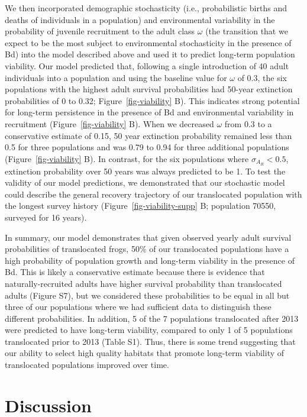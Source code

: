 \documentclass[9pt,twocolumn,twoside,lineno]{pnas-new}
\begin{document}
We then incorporated demographic stochasticity (i.e., probabilistic
births and deaths of individuals in a population) and environmental
variability in the probability of juvenile recruitment to the adult
class \(\omega\) (the transition that we expect to be the most subject
to environmental stochasticity in the presence of Bd) into the model
described above and used it to predict long-term population viability.
Our model predicted that, following a single introduction of 40 adult
individuals into a population and using the baseline value for
\(\omega\) of 0.3, the six populations with the highest adult survival
probabilities had 50-year extinction probabilities of 0 to 0.32;
Figure~\ref{fig-viability} B). This indicates strong potential for
long-term persistence in the presence of Bd and environmental
variability in recruitment (Figure~\ref{fig-viability} B). When we
decreased \(\omega\) from 0.3 to a conservative estimate of 0.15, 50
year extinction probability remained less than 0.5 for three populations
and was 0.79 to 0.94 for three additional populations
(Figure~\ref{fig-viability} B). In contrast, for the six populations
where \(\sigma_{A_R} < 0.5\), extinction probability over 50 years was
always predicted to be 1. To test the validity of our model predictions,
we demonstrated that our stochastic model could describe the general
recovery trajectory of our translocated population with the longest
survey history (Figure~\ref{fig-viability-supp} B; population 70550,
surveyed for 16 years).

In summary, our model demonstrates that given observed yearly adult
survival probabilities of translocated frogs, 50\% of our translocated
populations have a high probability of population growth and long-term
viability in the presence of Bd. This is likely a conservative estimate
because there is evidence that naturally-recruited adults have higher
survival probability than translocated adults
(Figure S7), but we considered these
probabilities to be equal in all but three of our populations where we
had sufficient data to distinguish these different probabilities. In
addition, 5 of the 7 populations translocated after 2013 were predicted
to have long-term viability, compared to only 1 of 5 populations
translocated prior to 2013 (Table S1). Thus,
there is some trend suggesting that our ability to select high quality
habitats that promote long-term viability of translocated populations
improved over time.

\section*{Discussion}
\end{document}
